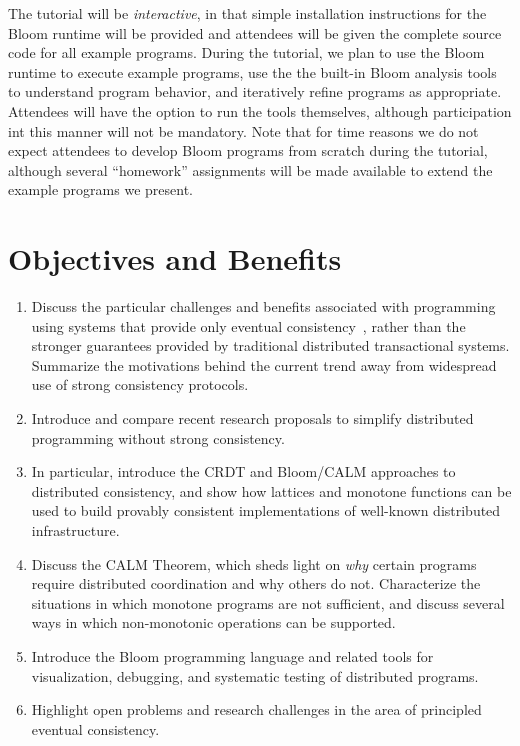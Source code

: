 \documentclass{sig-alternate}
\begin{document}
The tutorial will be \emph{interactive}, in that simple installation
instructions for the Bloom runtime will be provided and attendees will be given
the complete source code for all example programs. During the tutorial, we plan
to use the Bloom runtime to execute example programs, use the the built-in Bloom
analysis tools to understand program behavior, and iteratively refine programs
as appropriate. Attendees will have the option to run the tools themselves,
although participation int this manner will not be mandatory. Note that for time
reasons we do not expect attendees to develop Bloom programs from scratch during
the tutorial, although several ``homework'' assignments will be made available to
extend the example programs we present.

\section{Objectives and Benefits}

\begin{enumerate}
\item
  Discuss the particular challenges and benefits associated with programming
  using systems that provide only eventual
  consistency~\cite{DeCandia2007,Terry1995,vogels}, rather than the stronger
  guarantees provided by traditional distributed transactional systems.
  Summarize the motivations behind the current trend away from widespread use of
  strong consistency protocols.
\item
  Introduce and compare recent research proposals to simplify distributed
  programming without strong consistency.
\item
  In particular, introduce the CRDT and Bloom/CALM approaches to distributed
  consistency, and show how lattices and monotone functions can be used to build
  provably consistent implementations of well-known distributed infrastructure.
\item
  Discuss the CALM Theorem, which sheds light on \emph{why} certain programs
  require distributed coordination and why others do not.  Characterize the
  situations in which monotone programs are not sufficient, and discuss several
  ways in which non-monotonic operations can be supported.
\item
  Introduce the Bloom programming language and related tools for visualization,
  debugging, and systematic testing of distributed programs.
\item
  Highlight open problems and research challenges in the area of principled
  eventual consistency.
\end{enumerate}
\end{document}
